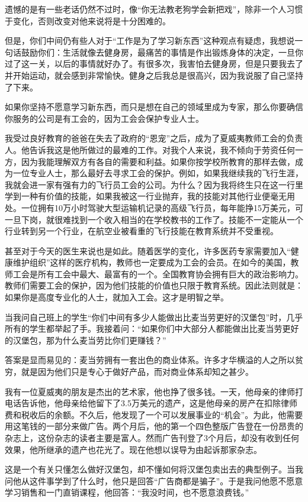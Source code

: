 遗憾的是有一些老话仍然不过时，像“你无法教老狗学会新把戏”，除非一个人习惯于变化，否则改变对他来说将是十分困难的。

但是，你们中间仍有些人对于“工作是为了学习新东西”这种观点有疑虑，我想说一句话鼓励你们：生活就像去健身房，最痛苦的事情是作出锻炼身体的决定，一旦你过了这一关，以后的事情就好办了。有很多次，我害怕去健身房，但是只要我去了并开始运动，就会感到非常愉快。健身之后我总是很高兴，因为我说服了自己坚持了下来。

如果你坚持不愿意学习新东西，而只是想在自己的领域里成为专家，那么你要确信你服务的公司是有工会的，因为工会会保护专业人士。

我受过良好教育的爸爸在失去了政府的“恩宠”之后，成为了夏威夷教师工会的负责人。他告诉我这是他所做过的最难的工作。对我个人来说，我不倾向于劳资任何一方，因为我能理解双方有各自的需要和利益。如果你按学校所教育的那样去做，成为一位专业人士，那么最好去寻求工会的保护。例如，如果我继续我的飞行生涯，我就会进一家有强有力的飞行员工会的公司。为什么？因为我将终生只在这一行里学到一种有价值的技能，如果我被这一行业抛弃，我的技能对其他行业便毫无用处。一位拥有10万小时驾驶大型运输机记录的高级飞行员，每年能挣15万美元，可一旦下岗，就很难找到一个收入相当的在学校教书的工作了。技能不一定能从一个行业转到另一个行业，在航空业被看重的飞行技能在教育系统并不受重视。

甚至对于今天的医生来说也是如此。随着医学的变化，许多医药专家需要加入“健康维护组织”这样的医疗机构，教师也一定要成为工会的会员。在如今的美国，教师工会是所有工会中最大、最富有的一个。全国教育协会拥有巨大的政治影响力。教师们需要工会的保护，因为他们技能的价值也只限于教育系统。因此法则就是：如果你是高度专业化的人士，就加入工会。这才是明智之举。

当我问自己班上的学生“你们中间有多少人能做出比麦当劳更好的汉堡包”时，几乎所有的学生都举起了手。我接着问：“如果你们中大部分人都能做出比麦当劳更好的汉堡包，那为什么麦当劳比你们更赚钱？”

答案是显而易见的：麦当劳拥有一套出色的商业体系。许多才华横溢的人之所以贫穷，就是因为他们只是专心于做好产品，而对商业体系却知之甚少。

我有一位夏威夷的朋友是杰出的艺术家，他也挣了很多钱。一天，他母亲的律师打电话告诉他，他母亲给他留下了3.5万美元的遗产，这是他母亲的房产在扣除律师费和税收后的余额。不久后，他发现了一个可以发展事业的“机会”。为此，他需要用这笔钱的一部分来做广告。两个月后，他的第一个四色整版广告登在一份昂贵的杂志上，这份杂志的读者主要是富人。然而广告刊登了3个月后，却没有收到任何效果，他所继承的遗产也花光了。现在他想以误导为由起诉那家杂志。

这是一个有关只懂怎么做好汉堡包，却不懂如何将汉堡包卖出去的典型例子。当我问他从这件事学到了什么时，他只是回答“广告商都是骗子”。于是我问他愿不愿意学习销售和一门直销课程，他回答：“我没时间，也不愿意浪费钱。”

